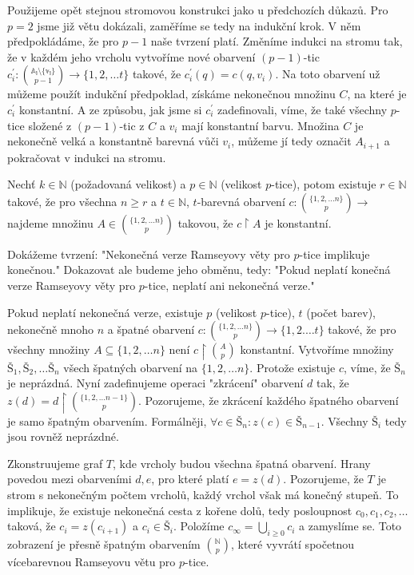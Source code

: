 \begin{t_proof}
  Použijeme opět stejnou stromovou konstrukci jako u předchozích důkazů. Pro $p=2$ jsme již větu dokázali, zaměříme se tedy na indukční krok. V něm předpokládáme, že pro $p-1$ naše tvrzení platí. Změníme indukci na stromu tak, že v každém jeho vrcholu vytvoříme nové obarvení $(p-1)$-tic $c_i^\prime:\binom{\mathbb{A_i\setminus\{v_i\}}}{p-1}\rightarrow\{1,2,\dots t\}$ takové, že $c_i^\prime(q)=c(q,v_i)$. Na toto obarvení už můžeme použít indukční předpoklad, získáme nekonečnou množinu $C$, na které je $c_i^\prime$ konstantní. A ze způsobu, jak jsme si $c_i^\prime$ zadefinovali, víme, že také všechny $p$-tice složené z $(p-1)$-tic z $C$ a $v_i$ mají konstantní barvu. Množina $C$ je nekonečně velká a konstantně barevná vůči $v_i$, můžeme jí tedy označit $A_{i+1}$ a pokračovat v indukci na stromu.
\end{t_proof}

\begin{t_theorem}
  Nechť $k\in\mathbb{N}$ (požadovaná velikost) a $p\in\mathbb{N}$ (velikost $p$-tice), potom existuje $r\in\mathbb{N}$ takové, že pro všechna $n\geq r$ a $t\in\mathbb{N}$, $t$-barevná obarvení $c:\binom{\{1,2,\dots n\}}{p}\rightarrow$ najdeme množinu $A\in\binom{\{1,2,\dots n\}}{p}$ takovou, že $c\restriction A$ je konstantní.
\end{t_theorem}

\begin{t_proof}
  Dokážeme tvrzení: "Nekonečná verze Ramseyovy věty pro $p$-tice implikuje konečnou." Dokazovat ale budeme jeho obměnu, tedy: "Pokud neplatí konečná verze Ramseyovy věty pro $p$-tice, neplatí ani nekonečná verze."

  Pokud neplatí nekonečná verze, existuje $p$ (velikost $p$-tice), $t$ (počet barev), nekonečně mnoho $n$ a špatné obarvení $c:\binom{\{1,2,\dots n\}}{p}\rightarrow \{1,2.\dots t\}$ takové, že pro všechny množiny $A\subseteq\{1,2,\dots n\}$ není $c\restriction\binom{A}{p}$ konstantní. Vytvoříme množiny $Š_1, Š_2,\dots Š_n$ všech špatných obarvení na $\{1,2,\dots n\}$. Protože existuje $c$, víme, že $Š_n$ je neprázdná. Nyní zadefinujeme operaci "zkrácení" obarvení $d$ tak, že $z(d)=d\restriction\binom{\{1,2,\dots n-1\}}{p}$. Pozorujeme, že zkrácení každého špatného obarvení je samo špatným obarvením. Formálněji, $\forall c\in Š_n:z(c)\in Š_{n-1}$. Všechny $Š_i$ tedy jsou rovněž neprázdné.

  Zkonstruujeme graf $T$, kde vrcholy budou všechna špatná obarvení. Hrany povedou mezi obarveními $d,e$, pro které platí $e=z(d)$. Pozorujeme, že $T$ je strom s nekonečným počtem vrcholů, každý vrchol však má konečný stupeň. To implikuje, že existuje nekonečná cesta z kořene dolů, tedy posloupnost $c_0,c_1,c_2,\dots$ taková, že $c_i=z(c_{i+1})$ a $c_i\in Š_i$. Položíme $c_\infty=\bigcup_{i\geq 0} c_i$ a zamyslíme se. Toto zobrazení je přesně špatným obarvením $\binom{\mathbb{N}}{p}$, které vyvrátí spočetnou vícebarevnou Ramseyovu větu pro $p$-tice.
\end{t_proof}

